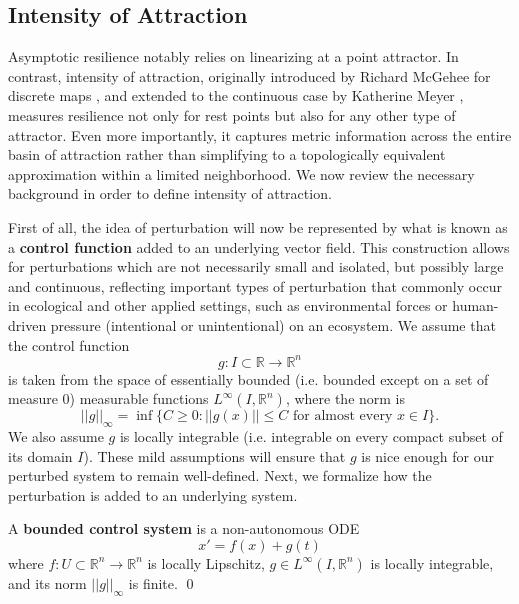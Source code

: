 \subsection{Intensity of Attraction}

Asymptotic resilience notably relies on linearizing at a point attractor. In contrast, intensity of attraction, originally introduced by Richard McGehee for discrete maps \cite{mcgeheeMetricPropertiesAttractors}, and extended to the continuous case by Katherine Meyer \cite{meyerMetricPropertiesAttractors2019}, measures resilience not only for rest points but also for any other type of attractor. Even more importantly, it captures metric information across the entire basin of attraction rather than simplifying to a topologically equivalent approximation within a limited neighborhood. We now review the necessary background in order to define intensity of attraction. 

First of all, the idea of perturbation will now be represented by what is known as a \textbf{control function} added to an underlying vector field. This construction allows for perturbations which are not necessarily small and isolated, but possibly large and continuous, reflecting important types of perturbation that commonly occur in ecological and other applied settings, such as environmental forces or human-driven pressure (intentional or unintentional) on an ecosystem. We assume that the control function $$g: I \subset \mathbb{R} \to \mathbb{R}^n$$ is taken from the space of essentially bounded (i.e. bounded except on a set of measure 0) measurable functions $L^\infty (I,\mathbb{R}^n)$, where the norm is 
$$||g||_\infty = \inf\{C \geq 0  :  ||g(x)|| \leq C  \text{ for almost every } x \in I \}.$$ 
We also assume $g$ is locally integrable (i.e. integrable on every compact subset of its domain $I$). These mild assumptions will ensure that $g$ is nice enough for our perturbed system to remain well-defined. Next, we formalize how the perturbation is added to an underlying system. 

\begin{definition}
	A \textbf{bounded control system}  is a non-autonomous ODE 
	\begin{equation}
		\label{eqn:control_ode}x' = f(x) + g(t)
	\end{equation}
	where $f: U \subset \mathbb{R}^n \to \mathbb{R}^n$ is locally Lipschitz, $g \in L^\infty (I,\mathbb{R}^n)$ is locally integrable, and its norm $||g||_\infty$ is finite.  \qed
\end{definition}

